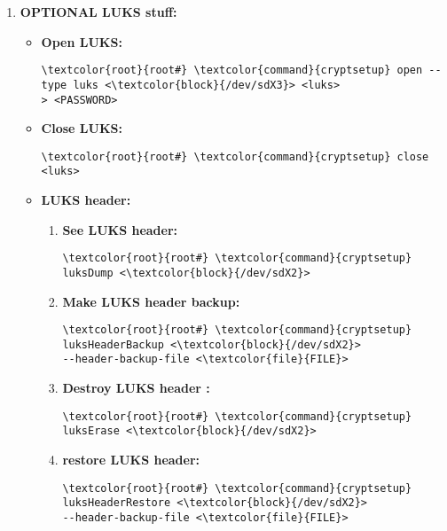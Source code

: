\documentclass[10pt, a4paper, onecolumn, openany]{book} %
\begin{document}
\begin{enumerate}
    \item \textbf{OPTIONAL LUKS stuff:}
    \begin{itemize}
        \item \textbf{Open LUKS:}
\begin{Verbatim}[commandchars=\\\{\}]
\textcolor{root}{root#} \textcolor{command}{cryptsetup} open --type luks <\textcolor{block}{/dev/sdX3}> <luks>
> <PASSWORD>
\end{Verbatim}
        \item \textbf{Close LUKS:}
\begin{Verbatim}[commandchars=\\\{\}]
\textcolor{root}{root#} \textcolor{command}{cryptsetup} close <luks>
\end{Verbatim}
\item \textbf{LUKS header:}
        \begin{enumerate}
            \item \textbf{See LUKS header:}
\begin{Verbatim}[commandchars=\\\{\}]
\textcolor{root}{root#} \textcolor{command}{cryptsetup} luksDump <\textcolor{block}{/dev/sdX2}>
\end{Verbatim}
            \item \textbf{Make LUKS header backup:}
\begin{Verbatim}[commandchars=\\\{\}]
\textcolor{root}{root#} \textcolor{command}{cryptsetup} luksHeaderBackup <\textcolor{block}{/dev/sdX2}>
--header-backup-file <\textcolor{file}{FILE}>
\end{Verbatim}
            \item \textbf{Destroy LUKS header :}
\begin{Verbatim}[commandchars=\\\{\}]
\textcolor{root}{root#} \textcolor{command}{cryptsetup} luksErase <\textcolor{block}{/dev/sdX2}>
\end{Verbatim}
            \item \textbf{restore LUKS header:}
\begin{Verbatim}[commandchars=\\\{\}]
\textcolor{root}{root#} \textcolor{command}{cryptsetup} luksHeaderRestore <\textcolor{block}{/dev/sdX2}> 
--header-backup-file <\textcolor{file}{FILE}>
\end{Verbatim}
        \end{enumerate}
    \end{itemize}


\end{enumerate}
\end{document}
